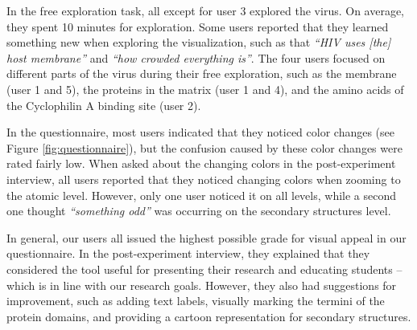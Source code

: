 \documentclass{egpubl}
\begin{document}
	

In the free exploration task, all except for user 3 explored the virus. 
On average, they spent 10 minutes for exploration. 
Some users reported that they learned something new when exploring the visualization, such as that \textit{``HIV uses [the] host membrane''} and \textit{``how crowded everything is''}. 
The four users focused on different parts of the virus during their free exploration, such as the membrane (user 1 and 5), the proteins in the matrix (user 1 and 4), and the amino acids of the Cyclophilin A binding site (user 2). 

In the questionnaire, most users indicated that they noticed color changes (see Figure \ref{fig:questionnaire}), but the confusion caused by these color changes were rated fairly low. 
When asked about the changing colors in the post-experiment interview, all users reported that they noticed changing colors when zooming to the atomic level. 
However, only one user noticed it on all levels, while a second one thought \textit{``something odd''} was occurring on the secondary structures level. 

In general, our users all issued the highest possible grade for visual appeal in our questionnaire. 
In the post-experiment interview, they explained that they considered the tool useful for presenting their research and educating students -- which is in line with our research goals. 
However, they also had suggestions for improvement, such as adding text labels, visually marking the termini of the protein domains, and providing a cartoon representation for secondary structures. 
\end{document}
